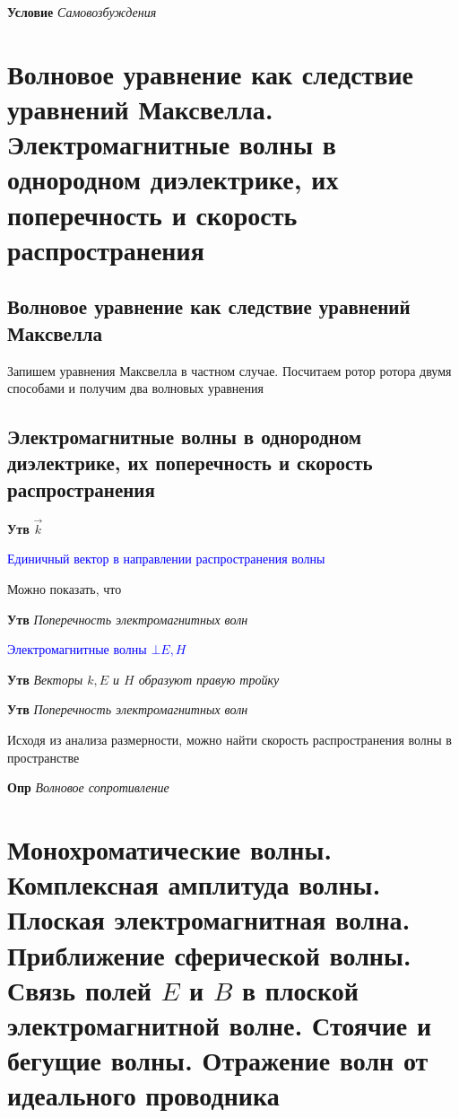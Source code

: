 \documentclass[a4paper, 14pt]{article}
\begin{document}
    \textbf{Условие} \textit{Самовозбуждения}
    
    \section{Волновое уравнение как следствие уравнений Максвелла.
    Электромагнитные волны в однородном диэлектрике, их поперечность и скорость распространения}
    
    \subsection{Волновое уравнение как следствие уравнений Максвелла}
    
    Запишем уравнения Максвелла в частном случае.
    Посчитаем ротор ротора двумя способами и получим два волновых уравнения
    
    \subsection{Электромагнитные волны в однородном диэлектрике, их поперечность и скорость распространения}
    
    \textbf{Утв} \textit{$\overrightarrow{k}$}
    
    \textcolor{blue}{Единичный вектор в направлении распространения волны}
    
    Можно показать, что
    
    \textbf{Утв} \textit{Поперечность электромагнитных волн}
    
    \textcolor{blue}{Электромагнитные волны $\bot E, H$}
    
    \textbf{Утв} \textit{Векторы $k, E$ и $H$ образуют правую тройку}
    
    \textbf{Утв} \textit{Поперечность электромагнитных волн}
    
    Исходя из анализа размерности, можно найти скорость распространения волны в пространстве
    
    \textbf{Опр} \textit{Волновое сопротивление}
    
    \section{Монохроматические волны.
    Комплексная амплитуда волны.
    Плоская электромагнитная волна.
    Приближение сферической волны.
    Связь полей $E$ и $B$ в плоской электромагнитной волне.
    Стоячие и бегущие волны.
    Отражение волн от идеального проводника}
    
\end{document}
